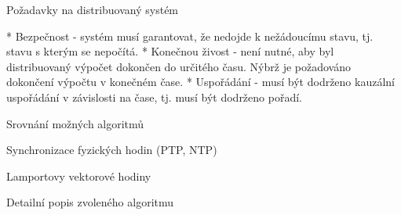 \secc Požadavky na distribuovaný systém

\begitems
* {\sbf Bezpečnost} - systém musí garantovat, že nedojde k nežádoucímu stavu, tj. stavu s kterým se nepočítá.
* {\sbf Konečnou živost} - není nutné, aby byl distribuovaný výpočet dokončen do určitého času. Nýbrž je požadováno dokončení výpočtu v konečném čase.
* {\sbf Uspořádání} - musí být dodrženo kauzální uspořádání v závislosti na čase, tj. musí být dodrženo pořadí.
\enditems

\sec Srovnání možných algoritmů

\secc Synchronizace fyzických hodin (PTP, NTP)

\secc Lamportovy vektorové hodiny



\sec Detailní popis zvoleného algoritmu